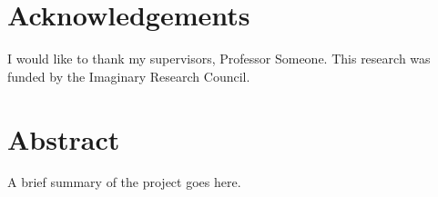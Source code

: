 \documentclass[
12pt,
a4paper, 
twoside,  %
openright, %
]{book}
\author{C.M.O.T Dibbler}
\begin{document}
	\frontmatter
	
	
	
	
	
	

	\printglossary[type=\acronymtype,title={Abbreviations}, style=alttree]
	\listoffigures
	\listoftables
	\tableofcontents

	\chapter{Acknowledgements}
	I would like to thank my supervisors, Professor Someone. This
	research was funded by the Imaginary Research Council.

	\chapter{Abstract}
	A brief summary of the project goes here.

	\mainmatter

	\printindex

\end{document}
